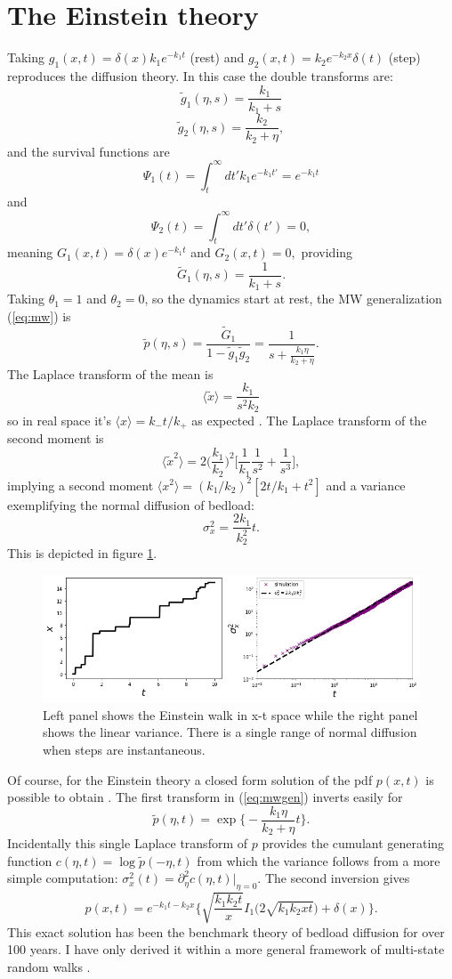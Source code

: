 \documentclass[11pt]{article}
\newcommand\be{\begin{equation}} %
\newcommand\ee{\end{equation}}   %
\newcommand\bra{\langle}
\newcommand\ket{\rangle}
\newcommand\tg{\tilde{g}}
\newcommand\tG{\tilde{G}}
\begin{document}
\section{The Einstein theory}
Taking $g_1(x,t) = \delta(x)k_1 e^{-k_1t}$ (rest) and $g_2(x,t) = k_2 e^{-k_2 x}\delta(t) $ (step) reproduces the \citet{Einstein1937} diffusion theory.
In this case the double transforms are: 
\be \tilde{g}_1(\eta,s) = \frac{k_1}{k_1+s}\ee
\be \tilde{g}_2(\eta,s) = \frac{k_2}{k_2+\eta}, \ee
and the survival functions are 
\be \Psi_1(t) = \int_t^\infty dt' k_1e^{-k_1 t'} = e^{-k_1 t} \ee
and 
\be \Psi_2(t) = \int_t^\infty dt' \delta(t') = 0 ,  \ee
meaning $G_1(x,t) = \delta(x) e^{-k_1 t}$ and $G_2(x,t) = 0,$ providing
\be \tG_1(\eta,s) = \frac{1}{k_1+s}.\ee
Taking $\theta_1=1$ and $\theta_2=0$, so the dynamics start at rest, the MW generalization (\ref{eq:mw}) is
\be \tilde{p}(\eta, s) = \frac{\tG_1}{1-\tg_1\tg_2} = \frac{1}{s + \frac{k_1 \eta}{k_2 + \eta }}.\label{eq:mwgen}\ee
The Laplace transform of the mean is 
\be \bra \tilde{x} \ket = \frac{k_1}{s^2 k_2}
\ee
so in real space it's $\bra x \ket = k_- t/k_+$ as expected \citep[e.g.][]{Einstein1937, Nakagawa1976}.
The Laplace transform of the second moment is 
\be\bra \tilde{x}^2 \ket = 2\Big(\frac{k_1}{k_2}\Big)^2 \Big[ \frac{1}{k_1}\frac{1}{s^2} + \frac{1}{s^3}\Big], \ee
implying a second moment $\bra x^2 \ket = (k_1/k_2)^2[2t/k_1+t^2] $
and a variance exemplifying the normal diffusion of bedload:
\be \sigma_x^2 = \frac{2k_1}{k_2^2}t.\ee
This is depicted in figure \ref{fig:einwalk}.
\begin{figure}[h]
	\centering
	\includegraphics[width=\linewidth,keepaspectratio]{combo0.png}
	\caption{Left panel shows the Einstein walk in x-t space while the right panel shows the linear variance. There is a single range of normal diffusion when steps are instantaneous.}
	\label{fig:einwalk}
\end{figure}
Of course, for the Einstein theory a closed form solution of the pdf $p(x,t)$ is possible to obtain \citep[e.g.][]{Einstein1937, Hubbell1964, Daly2006,Daly2019}.
The first transform in (\ref{eq:mwgen}) inverts easily for 
\be \tilde{p}(\eta,t) = \exp\Big\{-\frac{k_1\eta }{k_2 + \eta} t\Big\}.\ee
Incidentally this single Laplace transform of $p$ provides the cumulant generating function $c(\eta,t) = \log \tilde{p}(-\eta,t)$ from which the variance follows from a more simple computation: $\sigma_x^2(t) = \partial_\eta^2 c(\eta,t)\big|_{\eta=0}.$
The second inversion gives \citep[e.g.][]{Daly2019}
\be p(x,t) = e^{-k_1 t -k_2 x}\Big\{ \sqrt{\frac{k_1 k_2 t}{ x}} I_1\Big( 2\sqrt{k_1k_2 x t}\Big) + \delta(x) \Big\} .\ee
This exact solution has been the benchmark theory of bedload diffusion for over 100 years. I have only derived it within a more general framework of multi-state random walks \citep[e.g.][]{Weiss1994}.
\end{document}
